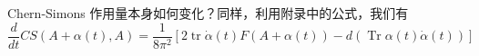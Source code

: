 
Chern-Simons 作用量本身如何变化？同样，利用附录中的公式，我们有
\begin{equation}
  \frac{d}{dt}CS(A+\alpha(t),A)
  =\frac{1}{8\pi^2}\left[2\operatorname{tr}\dot\alpha(t)F(A+\alpha(t))
  -d\left(\operatorname{Tr}\alpha(t)\dot\alpha(t)\right)\right]
  \tag{3.13}
  \label{eq:3.13}
\end{equation}
